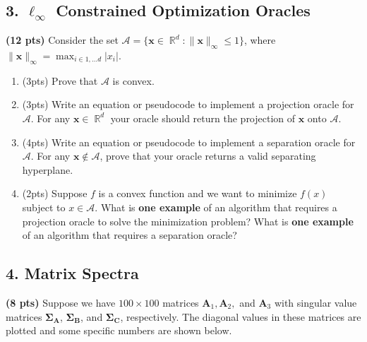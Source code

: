 \documentclass[10pt]{article}
\newcommand{\bs}[1]{\boldsymbol{#1}}
\newcommand{\bv}[1]{\mathbf{#1}}
\DeclareMathOperator{\R}{\mathbb{R}}
\begin{document}
\subsection{3. $\ell_{\infty}$ Constrained Optimization Oracles}
\textbf{(12 pts)} Consider the set $\mathcal{A} = \{\bv{x} \in \R^d: \|\bv{x}\|_{\infty} \leq 1\}$, where $\|\bv{x}\|_{\infty} = \max_{i\in 1,\ldots d} |x_i|$.
\begin{enumerate}[label=(\alph*)]		
	\item (3pts) Prove that $\mathcal{A}$ is convex. \vspace{16em}
	
	\item (3pts) Write an equation or pseudocode to implement a projection oracle for $\mathcal{A}$.  For any $\bv{x} \in \R^d$ your oracle should return the projection of $\bv{x}$ onto $\mathcal{A}$. \vspace{10em}


	\item (4pts) Write an equation or pseudocode to implement a separation oracle for $\mathcal{A}$. For any $\bv{x}\notin \mathcal{A}$, prove that your oracle returns a valid separating hyperplane.
	 \vspace{22em}
	 
	 
	 \item (2pts) Suppose $f$ is a convex function and we want to minimize $f(x)$ subject to $x\in \mathcal{A}$. What is \textbf{one example} of an algorithm that requires a projection oracle to solve the minimization problem? What is \textbf{one example}  of an algorithm that requires a separation oracle?
	 \vspace{16em}
\end{enumerate}

\newpage
\subsection{4. Matrix Spectra}
	\textbf{(8 pts)} Suppose we have $100\times 100$  matrices $\bv{A}_1, \bv{A}_2,$ and $\bv{A}_3$ with singular value matrices $\bs{\Sigma}_{\bv{A}}$, $\bs{\Sigma}_{\bv{B}}$, and $\bs{\Sigma}_{\bv{C}}$, respectively. The diagonal values in these matrices are plotted and some specific numbers are shown below. 
		
\end{document}
